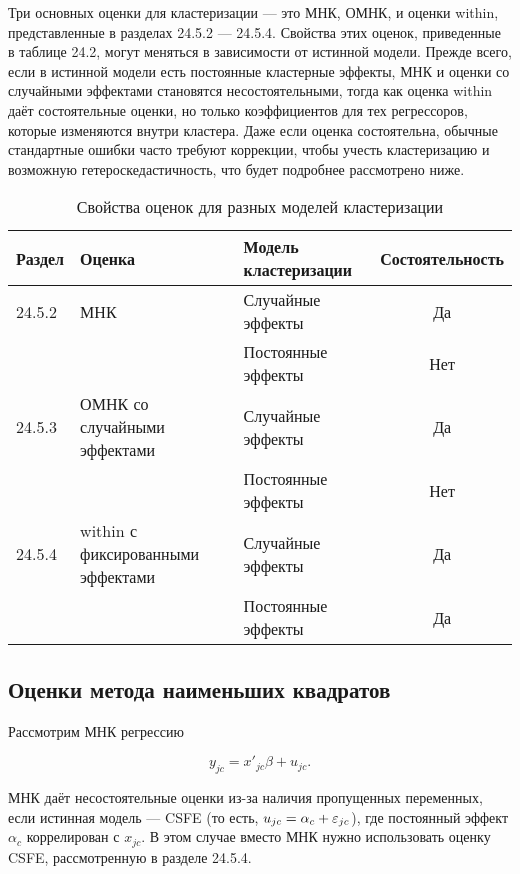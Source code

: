 Три основных оценки для кластеризации --- это МНК, ОМНК, и оценки within, представленные в разделах 24.5.2 --- 24.5.4. Свойства этих оценок, приведенные в таблице 24.2, могут меняться в зависимости от истинной модели. Прежде всего, если в истинной модели есть постоянные кластерные эффекты, МНК и оценки со случайными эффектами становятся несостоятельными, тогда как оценка within даёт состоятельные оценки, но только коэффициентов для тех регрессоров, которые изменяются внутри кластера. Даже если оценка состоятельна, обычные стандартные ошибки часто требуют коррекции, чтобы учесть кластеризацию и возможную гетероскедастичность, что будет подробнее рассмотрено ниже. 

\begin{table}[h]
\caption{\label{tab:clastpropert} Свойства оценок для разных моделей кластеризации}
\begin{center}
\begin{tabular}{lllc}
\hline
\hline
Раздел & Оценка & Модель кластеризации &  Состоятельность \\
\hline
24.5.2 & МНК & Случайные эффекты & Да \\
  &   & Постоянные эффекты & Нет \\
24.5.3 & ОМНК со случайными эффектами & Случайные эффекты & Да \\
  &   & Постоянные эффекты & Нет \\
24.5.4 & within с фиксированными эффектами & Случайные эффекты & Да \\
  &   & Постоянные эффекты & Да \\
\hline
\hline
\end{tabular}
\end{center}
\end{table}

\subsection{Оценки метода наименьших квадратов}

Рассмотрим МНК регрессию

\begin{equation}
\label{eq24.28}
y_{jc} = x'_{jc} \beta + u_{jc}.
\end{equation}

МНК даёт несостоятельные оценки из-за наличия пропущенных переменных, если истинная модель --- CSFE (то есть, $u_{jc} = \alpha_c + \varepsilon_{jc}$), где постоянный эффект $\alpha_c$ коррелирован с $x_{jc}$. В этом случае вместо МНК нужно использовать оценку CSFE, рассмотренную в разделе 24.5.4. 


